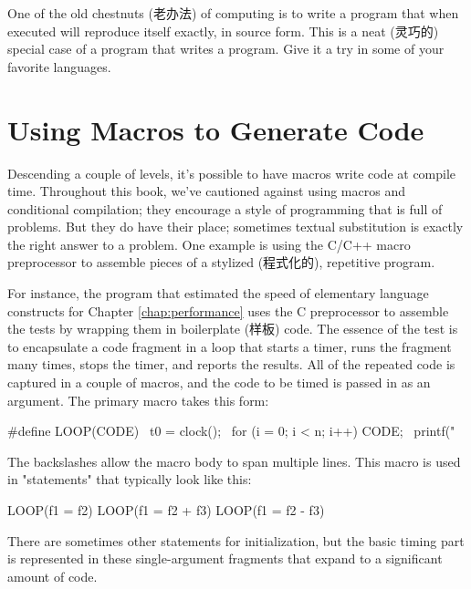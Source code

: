 \begin{exercise}
    One of the old chestnuts (老办法) of computing is to write a program
    that when executed will reproduce itself exactly, in source form. This
    is a neat (灵巧的) special case of a program that writes a program.
    Give it a try in some of your favorite languages.
\end{exercise}

\section{Using Macros to Generate Code}
\label{sec:using_macros_to_generate_code}

Descending a couple of levels, it's possible to have macros write code at
compile time. Throughout this book, we've cautioned against using macros
and conditional compilation; they encourage a style of programming that is
full of problems. But they do have their place; sometimes textual
substitution is exactly the right answer to a problem. One example is using
the C/C++ macro preprocessor to assemble pieces of a stylized (程式化的),
repetitive program.

For instance, the program that estimated the speed of elementary language
constructs for Chapter \ref{chap:performance} uses the C preprocessor to
assemble the tests by wrapping them in boilerplate (样板) code. The essence
of the test is to encapsulate a code fragment in a loop that starts a
timer, runs the fragment many times, stops the timer, and reports the
results. All of the repeated code is captured in a couple of macros, and
the code to be timed is passed in as an argument. The primary macro takes
this form:
\begin{wellcode}
    #define LOOP(CODE) {                    \
        t0 = clock();                       \
        for (i = 0; i < n; i++) { CODE; }   \
        printf("%
    }
\end{wellcode}
The backslashes allow the macro body to span multiple lines. This macro is
used in "statements" that typically look like this:
\begin{wellcode}
    LOOP(f1 = f2)
    LOOP(f1 = f2 + f3)
    LOOP(f1 = f2 - f3)
\end{wellcode}
There are sometimes other statements for initialization, but the basic
timing part is represented in these single-argument fragments that expand
to a significant amount of code.

